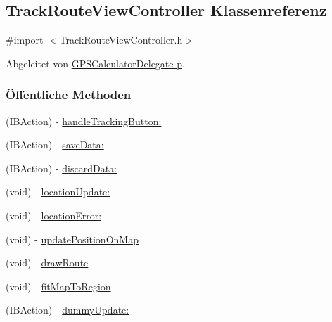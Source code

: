 \hypertarget{interface_track_route_view_controller}{
\subsection{TrackRouteViewController Klassenreferenz}
\label{interface_track_route_view_controller}
}


{\ttfamily \#import $<$TrackRouteViewController.h$>$}

Abgeleitet von \hyperlink{protocol_g_p_s_calculator_delegate-p}{GPSCalculatorDelegate-\/p}.\subsubsection*{Öffentliche Methoden}
\begin{DoxyCompactItemize}
\item 
(IBAction) -\/ \hyperlink{interface_track_route_view_controller_a2cfd0c048bca5a6eb507e2a34160ce7c}{handleTrackingButton:}
\item 
(IBAction) -\/ \hyperlink{interface_track_route_view_controller_afb7c18ca4ee200ca7dc53970875d4447}{saveData:}
\item 
(IBAction) -\/ \hyperlink{interface_track_route_view_controller_addff528a677e807a710e4c1c08f3f960}{discardData:}
\item 
(void) -\/ \hyperlink{interface_track_route_view_controller_a5e00299e28aae82b6687fc1321ed1873}{locationUpdate:}
\item 
(void) -\/ \hyperlink{interface_track_route_view_controller_a451898caf9041899f09f3c7afa57dc8b}{locationError:}
\item 
(void) -\/ \hyperlink{interface_track_route_view_controller_a33a6dc8e9818b566b1d15b9a1c6130f0}{updatePositionOnMap}
\item 
(void) -\/ \hyperlink{interface_track_route_view_controller_aa35a93f4325aa79c0043310d34ae0a35}{drawRoute}
\item 
(void) -\/ \hyperlink{interface_track_route_view_controller_a318fa1634b09695c451368949fd6b7d8}{fitMapToRegion}
\item 
(IBAction) -\/ \hyperlink{interface_track_route_view_controller_ac8d668c4e9c5a18e68512d2feb276ca1}{dummyUpdate:}
\end{DoxyCompactItemize}
